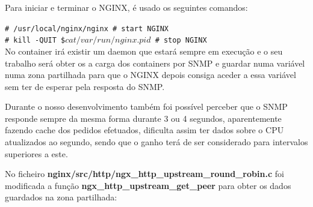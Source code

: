 \documentclass[pdftex,12pt,a4paper]{report}
\newcommand{\shellcmd}[1]{\indent\indent\texttt{\footnotesize\# #1}\\}
\begin{document}
Para iniciar e terminar o NGINX, é usado os seguintes comandos:

\shellcmd{/usr/local/nginx/nginx \# start NGINX}
\shellcmd{kill -QUIT \$\( cat /var/run/nginx.pid \) \# stop NGINX}

No container irá existir um daemon que estará sempre em execução e o seu trabalho será obter os a carga dos containers por SNMP e guardar numa variável numa zona partilhada para que o NGINX depois consiga aceder a essa variável sem ter de esperar pela resposta do SNMP. 

Durante o nosso desenvolvimento também foi possível perceber que o SNMP responde sempre da mesma forma durante 3 ou 4 segundos, aparentemente fazendo cache dos pedidos efetuados, dificulta assim ter dados sobre o CPU atualizados ao segundo, sendo que o ganho terá de ser considerado para intervalos superiores a este.

No ficheiro \textbf{nginx/src/http/ngx\_http\_upstream\_round\_robin.c} foi  modificada a função \textbf{ngx\_http\_upstream\_get\_peer} para obter os dados guardados na zona partilhada:
\end{document}

